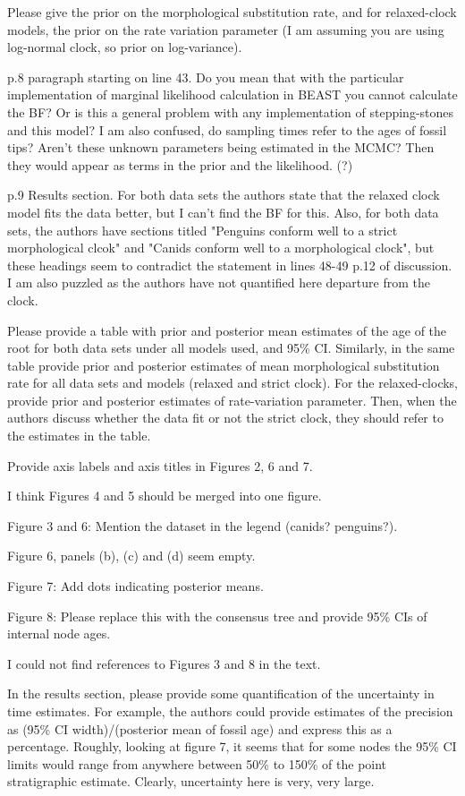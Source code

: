 \documentclass[11pt]{article}
\begin{document}
Please give the prior on the morphological substitution rate, and for relaxed-clock models, the prior on the rate variation parameter (I am assuming you are using log-normal clock, so prior on log-variance).

p.8 paragraph starting on line 43. Do you mean that with the particular implementation of marginal likelihood calculation in BEAST you cannot calculate the BF? Or is this a general problem with any implementation of stepping-stones and this model? I am also confused, do sampling times refer to the ages of fossil tips? Aren't these unknown parameters being estimated in the MCMC? Then they would appear as terms in the prior and the likelihood. (?)

p.9 Results section. For both data sets the authors state that the relaxed clock model fits the data better, but I can't find the BF for this. Also, for both data sets, the authors have sections titled "Penguins conform well to a strict morphological clcok" and "Canids conform well to a morphological clock", but these headings seem to contradict the statement in lines 48-49 p.12 of discussion. I am also puzzled as the authors have not quantified here departure from the clock. 

Please provide a table with prior and posterior mean estimates of the age of the root for both data sets under all models used, and 95\% CI. Similarly, in the same table provide prior and posterior estimates of mean morphological substitution rate for all data sets and models (relaxed and strict clock). For the relaxed-clocks, provide prior and posterior estimates of rate-variation parameter. Then, when the authors discuss whether the data fit or not the strict clock, they should refer to the estimates in the table.

Provide axis labels and axis titles in Figures 2, 6 and 7.

I think Figures 4 and 5 should be merged into one figure.

Figure 3 and 6: Mention the dataset in the legend (canids? penguins?).

Figure 6, panels (b), (c) and (d) seem empty.

Figure 7: Add dots indicating posterior means.

Figure 8: Please replace this with the consensus tree and provide 95\% CIs of internal node ages.

I could not find references to Figures 3 and 8 in the text.

In the results section, please provide some quantification of the uncertainty in time estimates. For example,  the authors could provide estimates of the precision as (95\% CI width)/(posterior mean of fossil age) and express this as a percentage. Roughly, looking at figure 7, it seems that for some nodes the 95\% CI limits would range from anywhere between 50\% to 150\% of the point stratigraphic estimate. Clearly, uncertainty here is very, very large. 
\end{document}
